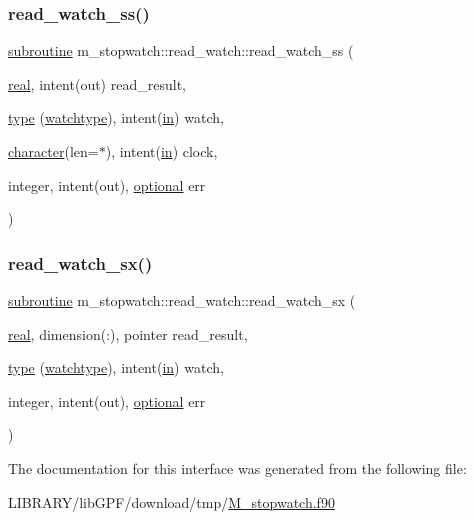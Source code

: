 \subsubsection{\texorpdfstring{read\+\_\+watch\+\_\+ss()}{read\_watch\_ss()}}
{\footnotesize\ttfamily \hyperlink{M__stopwatch_83_8txt_acfbcff50169d691ff02d4a123ed70482}{subroutine} m\+\_\+stopwatch\+::read\+\_\+watch\+::read\+\_\+watch\+\_\+ss (\begin{DoxyParamCaption}\item[{\hyperlink{read__watch_83_8txt_abdb62bde002f38ef75f810d3a905a823}{real}, intent(out)}]{read\+\_\+result,  }\item[{\hyperlink{stop__watch_83_8txt_a70f0ead91c32e25323c03265aa302c1c}{type} (\hyperlink{structm__stopwatch_1_1watchtype}{watchtype}), intent(\hyperlink{M__journal_83_8txt_afce72651d1eed785a2132bee863b2f38}{in})}]{watch,  }\item[{\hyperlink{option__stopwatch_83_8txt_abd4b21fbbd175834027b5224bfe97e66}{character}(len=$\ast$), intent(\hyperlink{M__journal_83_8txt_afce72651d1eed785a2132bee863b2f38}{in})}]{clock,  }\item[{integer, intent(out), \hyperlink{option__stopwatch_83_8txt_aa4ece75e7acf58a4843f70fe18c3ade5}{optional}}]{err }\end{DoxyParamCaption})\hspace{0.3cm}{\ttfamily [private]}}

\mbox{\label{interfacem__stopwatch_1_1read__watch_ab4f2a9002e2bd063065239e88f50a6b8}} 
\subsubsection{\texorpdfstring{read\+\_\+watch\+\_\+sx()}{read\_watch\_sx()}}
{\footnotesize\ttfamily \hyperlink{M__stopwatch_83_8txt_acfbcff50169d691ff02d4a123ed70482}{subroutine} m\+\_\+stopwatch\+::read\+\_\+watch\+::read\+\_\+watch\+\_\+sx (\begin{DoxyParamCaption}\item[{\hyperlink{read__watch_83_8txt_abdb62bde002f38ef75f810d3a905a823}{real}, dimension(\+:), pointer}]{read\+\_\+result,  }\item[{\hyperlink{stop__watch_83_8txt_a70f0ead91c32e25323c03265aa302c1c}{type} (\hyperlink{structm__stopwatch_1_1watchtype}{watchtype}), intent(\hyperlink{M__journal_83_8txt_afce72651d1eed785a2132bee863b2f38}{in})}]{watch,  }\item[{integer, intent(out), \hyperlink{option__stopwatch_83_8txt_aa4ece75e7acf58a4843f70fe18c3ade5}{optional}}]{err }\end{DoxyParamCaption})\hspace{0.3cm}{\ttfamily [private]}}



The documentation for this interface was generated from the following file\+:\begin{DoxyCompactItemize}
\item 
L\+I\+B\+R\+A\+R\+Y/lib\+G\+P\+F/download/tmp/\hyperlink{M__stopwatch_8f90}{M\+\_\+stopwatch.\+f90}\end{DoxyCompactItemize}
